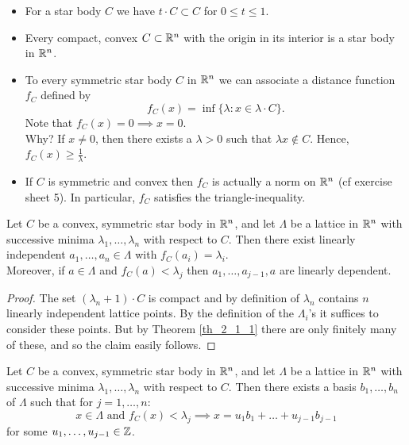 \documentclass[NumTh.tex]{subfiles}
\begin{document}

\begin{rem}
  \begin{itemize}
    \item For a star body $C$ we have $t \cdot C \subset C$ for $0 \leq t \leq 1$.
    \item Every compact, convex $C \subset \mathbb{R}^n$ with the origin in its interior is a star body in $\mathbb{R}^n$.
    \item To every symmetric star body $C$ in $\mathbb{R}^n$ we can associate a distance function $f_C$ defined by
    \[ f_C(x) = \inf \{ \lambda: x \in \lambda \cdot C \} \text{.} \]
    Note that $f_C(x) = 0 \implies x =0$. \\
    Why? If $x \neq 0$, then there exists a $\lambda > 0$ such that $\lambda x \nin C$.
    Hence, $f_C(x) \geq \frac{1}{\lambda}$.
    \item If $C$ is symmetric and convex then $f_C$ is actually a norm on $\mathbb{R}^n$ (cf exercise sheet 5).
    In particular, $f_C$ satisfies the triangle-inequality.
  \end{itemize}
\end{rem}

\begin{lemma}\label{l_2_3_3}
  Let $C$ be a convex, symmetric star body in $\mathbb{R}^n$, and let $\Lambda$ be a lattice in $\mathbb{R}^n$ with successive minima $\lambda_1,\dots,\lambda_n$ with respect to $C$.
  Then there exist linearly independent $a_1,\dots,a_n \in \Lambda$ with $f_C(a_i) =  \lambda_i$.\\
  Moreover, if $a \in \Lambda$ and $f_C(a) < \lambda_j$ then $a_1,\dots,a_{j-1},a$ are linearly dependent.
\end{lemma}

\begin{proof}
  The set $(\lambda_n +1) \cdot C$ is compact and by definition of $\lambda_n$ contains $n$ linearly independent lattice points.
  By the definition of the $\Lambda_i$'s it suffices to consider these points.
  But by Theorem \ref{th_2_1_1} there are only finitely many of these, and so the claim easily follows.
\end{proof}

\begin{cor}\label{cor_2_3_4}
  Let $C$ be a convex, symmetric star body in $\mathbb{R}^n$, and let $\Lambda$ be a lattice in $\mathbb{R}^n$ with successive minima $\lambda_1,\dots,\lambda_n$ with respect to $C$.
  Then there exists a basis $b_1,\dots,b_n$ of $\Lambda$ such that for $j = 1,\dots,n$: 
  \[x \in \Lambda \text{ and } f_C(x) < \lambda_j \implies x = u_1 b_1 + \dots + u_{j-1} b_{j-1} \] 
  for some $u_1,\dots,u_{j-1} \in \mathbb{Z}$.
\end{cor}
\end{document}
